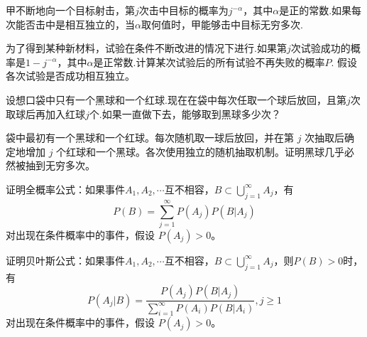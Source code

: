 \begin{exercise}[无穷多次成功的条件]\label{q:Y2.26}
甲不断地向一个目标射击，第$j$次击中目标的概率为$j^{-\alpha}$，其中$\alpha$是正的常数.如果每次能否击中是相互独立的，当$\alpha$取何值时，甲能够击中目标无穷多次.\par{}\end{exercise}

\begin{exercise}[最终不再失败的条件]\label{q:Y2.27}
为了得到某种新材料，试验在条件不断改进的情况下进行.如果第$j$次试验成功的概率是$1-j^{-\alpha}$，其中$\alpha$是正常数.计算某次试验后的所有试验不再失败的概率$P$. 假设各次试验是否成功相互独立。\par{}\end{exercise}

\begin{exercise}[加红球后的黑球出现次数]\label{q:Y2.28}
设想口袋中只有一个黑球和一个红球.现在在袋中每次任取一个球后放回，且第$j$次取球后再加入红球$j$个.如果一直做下去，能够取到黑球多少次？\par{}\end{exercise}

\begin{exercise}[黑红同时增长的抽球]\label{q:Y2.29}
袋中最初有一个黑球和一个红球。每次随机取一球后放回，并在第 $j$ 次抽取后确定地增加 $j$ 个红球和一个黑球。各次使用独立的随机抽取机制。证明黑球几乎必然被抽到无穷多次。\par{}\end{exercise}

\begin{exercise}[全概率公式的证明]\label{q:Y2.30}
证明全概率公式：如果事件$A_1,A_2,\cdots$互不相容，$B\subset \bigcup\limits_{j = 1}^\infty  {{A_j}} $，有
\[P(B) = \sum\limits_{j = 1}^\infty  {P({A_j})P(B|{A_j})} \] 对出现在条件概率中的事件，假设 $P(A_j)>0$。\par{}\end{exercise}

\begin{exercise}[贝叶斯公式的证明]\label{q:Y2.31}
证明贝叶斯公式：如果事件$A_1,A_2,\cdots$互不相容，$B\subset \bigcup\limits_{j = 1}^\infty  {{A_j}} $，则$P(B)>0$时，有
\[P({A_j}|B) = \frac{{P({A_j})P(B|{A_j})}}{{\sum\limits_{i = 1}^\infty  {P({A_i})P(B|{A_i})} }},j \geqslant 1\] 对出现在条件概率中的事件，假设 $P(A_j)>0$。\par{}\end{exercise}


